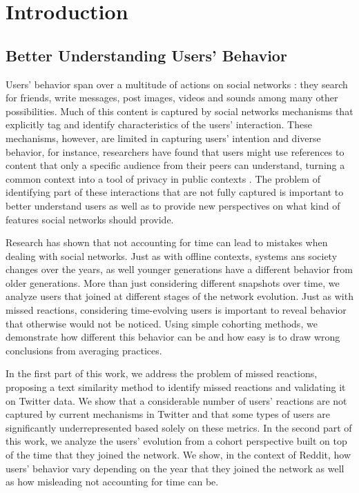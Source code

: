 \chapter{Introduction}


\section{Better Understanding Users' Behavior}

Users' behavior span over a multitude of actions on social networks \cite{Benevenuto2009, Gilbert2009, Comarela2012}: they search for friends, write messages, post images, videos and sounds among many other possibilities. Much of this content is captured by social networks mechanisms that explicitly tag and identify characteristics of the users' interaction. These mechanisms, however, are limited in capturing users' intention and diverse behavior, for instance, researchers have found that users might use references to content that only a specific audience from their peers can understand, turning a common context into a tool of privacy in public contexts \cite{Boyd2011}. The problem of identifying part of these interactions that are not fully captured is important to better understand users as well as to provide new perspectives on what kind of features social networks should provide.

Research has shown that not accounting for time can lead to mistakes when dealing with social networks. Just as with offline contexts, systems ans society changes over the years, as well younger generations have a different behavior from older generations. More than just considering different snapshots over time, we analyze users that joined at different stages of the network evolution. Just as with missed reactions, considering time-evolving users is important to reveal behavior that otherwise would not be noticed. Using simple cohorting methods, we demonstrate how different this behavior can be and how easy is to draw wrong conclusions from averaging practices.

In the first part of this work, we address the problem of missed reactions, proposing a text similarity method to identify missed reactions and validating it on Twitter data. We show that a considerable number of users' reactions are not captured by current mechanisms in Twitter and that some types of users are significantly underrepresented based solely on these metrics. In the second part of this work, we analyze the users' evolution from a cohort perspective built on top of the time that they joined the network. We show, in the context of Reddit, how users' behavior vary depending on the year that they joined the network as well as how misleading not accounting for time can be. 

